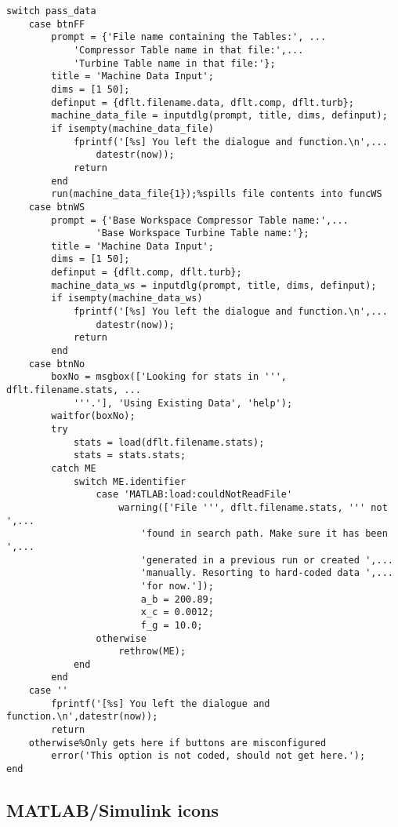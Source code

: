 \begin{verbatim}
switch pass_data
    case btnFF
        prompt = {'File name containing the Tables:', ...
            'Compressor Table name in that file:',...
            'Turbine Table name in that file:'};
        title = 'Machine Data Input';
        dims = [1 50];
        definput = {dflt.filename.data, dflt.comp, dflt.turb};
        machine_data_file = inputdlg(prompt, title, dims, definput);
        if isempty(machine_data_file)
            fprintf('[%s] You left the dialogue and function.\n',...
                datestr(now));
            return
        end
        run(machine_data_file{1});%spills file contents into funcWS
    case btnWS
        prompt = {'Base Workspace Compressor Table name:',...
                'Base Workspace Turbine Table name:'};
        title = 'Machine Data Input';
        dims = [1 50];
        definput = {dflt.comp, dflt.turb};
        machine_data_ws = inputdlg(prompt, title, dims, definput);
        if isempty(machine_data_ws)
            fprintf('[%s] You left the dialogue and function.\n',...
                datestr(now));
            return
        end
    case btnNo
        boxNo = msgbox(['Looking for stats in ''', dflt.filename.stats, ...
            '''.'], 'Using Existing Data', 'help');
        waitfor(boxNo);
        try
            stats = load(dflt.filename.stats);
            stats = stats.stats;
        catch ME
            switch ME.identifier
                case 'MATLAB:load:couldNotReadFile'
                    warning(['File ''', dflt.filename.stats, ''' not ',...
                        'found in search path. Make sure it has been ',...
                        'generated in a previous run or created ',...
                        'manually. Resorting to hard-coded data ',...
                        'for now.']);
                        a_b = 200.89;
                        x_c = 0.0012;
                        f_g = 10.0;
                otherwise
                    rethrow(ME);
            end
        end
    case ''
        fprintf('[%s] You left the dialogue and function.\n',datestr(now));
        return
    otherwise%Only gets here if buttons are misconfigured
        error('This option is not coded, should not get here.');
end
\end{verbatim}

\subsection{MATLAB/Simulink icons}

